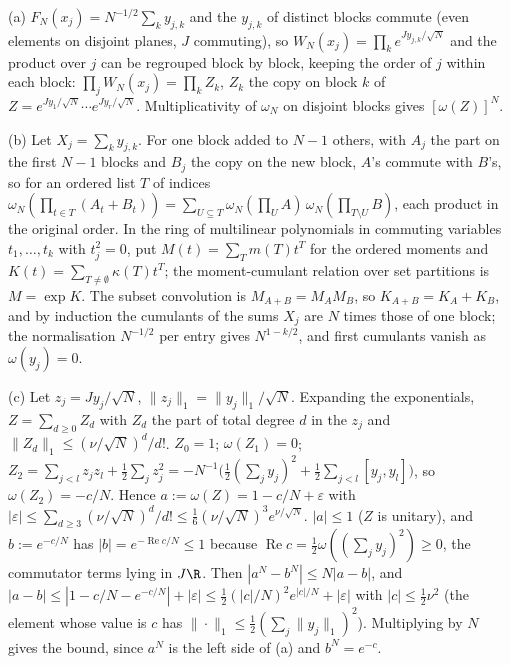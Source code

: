 (a) $F_{N}(x_{j}) = N^{-1/2}\sum_{k}y_{j,k}$ and the $y_{j,k}$ of distinct blocks commute (even elements on disjoint planes, $J$ commuting), so $W_{N}(x_{j}) = \prod_{k}e^{Jy_{j,k}/\sqrt N}$ and the product over $j$ can be regrouped block by block, keeping the order of $j$ within each block: $\prod_{j}W_{N}(x_{j}) = \prod_{k}Z_{k}$, $Z_{k}$ the copy on block $k$ of $Z = e^{Jy_{1}/\sqrt N}\cdots e^{Jy_{r}/\sqrt N}$. Multiplicativity of $\omega_{N}$ on disjoint blocks gives $[\omega(Z)]^{N}$.

(b) Let $X_{j} = \sum_{k}y_{j,k}$. For one block added to $N - 1$ others, with $A_{j}$ the part on the first $N - 1$ blocks and $B_{j}$ the copy on the new block, $A$'s commute with $B$'s, so for an ordered list $T$ of indices $\omega_{N}(\prod_{t \in T}(A_{t} + B_{t})) = \sum_{U \subseteq T}\omega_{N}(\prod_{U}A)\,\omega_{N}(\prod_{T \setminus U}B)$, each product in the original order. In the ring of multilinear polynomials in commuting variables $t_{1}, \dots, t_{k}$ with $t_{j}^{2} = 0$, put $M(t) = \sum_{T}m(T)t^{T}$ for the ordered moments and $K(t) = \sum_{T \ne \emptyset}\kappa(T)t^{T}$; the moment-cumulant relation over set partitions is $M = \exp K$. The subset convolution is $M_{A + B} = M_{A}M_{B}$, so $K_{A + B} = K_{A} + K_{B}$, and by induction the cumulants of the sums $X_{j}$ are $N$ times those of one block; the normalisation $N^{-1/2}$ per entry gives $N^{1 - k/2}$, and first cumulants vanish as $\omega(y_{j}) = 0$.

(c) Let $z_{j} = Jy_{j}/\sqrt N$, $\|z_{j}\|_{1} = \|y_{j}\|_{1}/\sqrt N$. Expanding the exponentials, $Z = \sum_{d \ge 0}Z_{d}$ with $Z_{d}$ the part of total degree $d$ in the $z_{j}$ and $\|Z_{d}\|_{1} \le (\nu/\sqrt N)^{d}/d!$. $Z_{0} = 1$; $\omega(Z_{1}) = 0$; $Z_{2} = \sum_{j < l}z_{j}z_{l} + \tfrac12\sum_{j}z_{j}^{2} = -N^{-1}\bigl(\tfrac12(\sum_{j}y_{j})^{2} + \tfrac12\sum_{j < l}[y_{j}, y_{l}]\bigr)$, so $\omega(Z_{2}) = -c/N$. Hence $a := \omega(Z) = 1 - c/N + \varepsilon$ with $|\varepsilon| \le \sum_{d \ge 3}(\nu/\sqrt N)^{d}/d! \le \tfrac16(\nu/\sqrt N)^{3}e^{\nu/\sqrt N}$. $|a| \le 1$ ($Z$ is unitary), and $b := e^{-c/N}$ has $|b| = e^{-\operatorname{Re}c/N} \le 1$ because $\operatorname{Re}c = \tfrac12\omega((\sum_{j}y_{j})^{2}) \ge 0$, the commutator terms lying in $J\R$. Then $|a^{N} - b^{N}| \le N|a - b|$, and $|a - b| \le |1 - c/N - e^{-c/N}| + |\varepsilon| \le \tfrac12(|c|/N)^{2}e^{|c|/N} + |\varepsilon|$ with $|c| \le \tfrac12 \nu^{2}$ (the element whose value is $c$ has $\|\cdot\|_{1} \le \tfrac12(\sum_{j}\|y_{j}\|_{1})^{2}$). Multiplying by $N$ gives the bound, since $a^{N}$ is the left side of (a) and $b^{N} = e^{-c}$.

